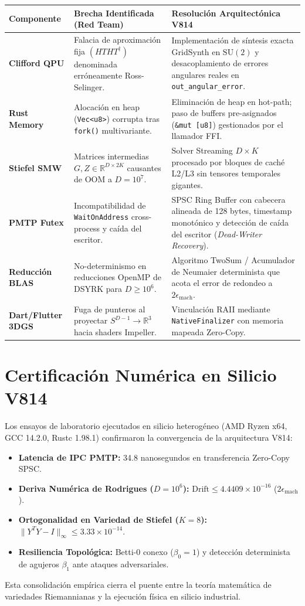 \centering
\begin{tabular}{|l|p{5cm}|p{6.5cm}|}
\hline
\textbf{Componente} & \textbf{Brecha Identificada (Red Team)} & \textbf{Resolución Arquitectónica V814} \\ \hline
\textbf{Clifford QPU} & Falacia de aproximación fija $(HTHT^\dagger)$ denominada erróneamente Ross-Selinger. & Implementación de síntesis exacta GridSynth en $\mathrm{SU}(2)$ y desacoplamiento de errores angulares reales en \texttt{out\_angular\_error}. \\ \hline
\textbf{Rust Memory} & Alocación en heap (\texttt{Vec<u8>}) corrupta tras \texttt{fork()} multivariante. & Eliminación de heap en hot-path; paso de buffers pre-asignados (\texttt{\&mut [u8]}) gestionados por el llamador FFI. \\ \hline
\textbf{Stiefel SMW} & Matrices intermedias $G, Z \in \mathbb{R}^{D \times 2K}$ causantes de OOM a $D=10^7$. & Solver Streaming $D \times K$ procesado por bloques de caché L2/L3 sin tensores temporales gigantes. \\ \hline
\textbf{PMTP Futex} & Incompatibilidad de \texttt{WaitOnAddress} cross-process y caída del escritor. & SPSC Ring Buffer con cabecera alineada de 128 bytes, timestamp monotónico y detección de caída del escritor (\textit{Dead-Writer Recovery}). \\ \hline
\textbf{Reducción BLAS} & No-determinismo en reducciones OpenMP de DSYRK para $D \ge 10^6$. & Algoritmo TwoSum / Acumulador de Neumaier determinista que acota el error de redondeo a $2\epsilon_{\text{mach}}$. \\ \hline
\textbf{Dart/Flutter 3DGS} & Fuga de punteros al proyectar $S^{D-1} \to \mathbb{R}^3$ hacia shaders Impeller. & Vinculación RAII mediante \texttt{NativeFinalizer} con memoria mapeada Zero-Copy. \\ \hline
\end{tabular}




\section{Certificación Numérica en Silicio V814}

Los ensayos de laboratorio ejecutados en silicio heterogéneo (AMD Ryzen x64, GCC 14.2.0, Rustc 1.98.1) confirmaron la convergencia de la arquitectura V814:

\begin{itemize}
    \item \textbf{Latencia de IPC PMTP:} 34.8 nanosegundos en transferencia Zero-Copy SPSC.
    \item \textbf{Deriva Numérica de Rodrigues ($D=10^6$):} $\text{Drift} \le 4.4409 \times 10^{-16}$ ($2\epsilon_{\text{mach}}$).
    \item \textbf{Ortogonalidad en Variedad de Stiefel ($K=8$):} $\|Y^T Y - I\|_{\infty} \le 3.33 \times 10^{-14}$.
    \item \textbf{Resiliencia Topológica:} Betti-0 conexo ($\beta_0 = 1$) y detección determinista de agujeros $\beta_1$ ante ataques adversariales.
\end{itemize}

Esta consolidación empírica cierra el puente entre la teoría matemática de variedades Riemannianas y la ejecución física en silicio industrial.
